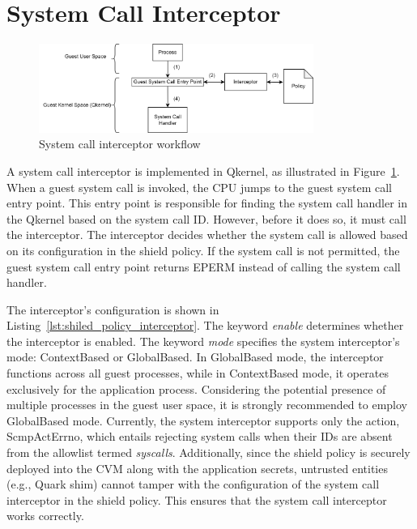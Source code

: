 \section{System Call Interceptor}
\label{sec:design_Interceptor}
\begin{figure}[!htb]
    \centering
    \includegraphics[width=0.8\textwidth]{images/syscall_interceptor.png}
    \caption[System call interceptor workflow]{System call interceptor workflow}
    \label{fig:syscall_interceptor}
\end{figure}
A system call interceptor is implemented in Qkernel, as illustrated in Figure~\ref{fig:syscall_interceptor}. When a guest system call is invoked, the CPU jumps to the guest system call entry point. This entry point is responsible for finding the system call handler in the Qkernel based on the system 
call ID. However, before it does so, it must call the interceptor. The interceptor decides whether the system call is allowed based on its configuration in the shield policy. If the system call is not permitted, the guest system call entry point returns EPERM instead of calling the 
system call handler. 

The interceptor's configuration is shown in Listing~\ref{lst:shiled_policy_interceptor}. The keyword \emph{enable} determines whether the interceptor is enabled. The keyword \emph{mode} specifies the system interceptor's mode: ContextBased or GlobalBased. In GlobalBased mode, the interceptor 
functions across all guest processes, while in ContextBased mode, it operates exclusively for the application process. Considering the potential presence of multiple processes in the guest user space, it is strongly recommended to employ GlobalBased mode. Currently, the system 
interceptor supports only the action, ScmpActErrno, which entails rejecting system calls when their IDs are absent from the allowlist termed \emph{syscalls}. Additionally, since the shield policy is securely deployed into the \acrshort{CVM} along with the application secrets, 
untrusted entities (e.g., Quark shim) cannot tamper with the configuration of the system call interceptor in the shield policy. This ensures that the system call interceptor works correctly.

